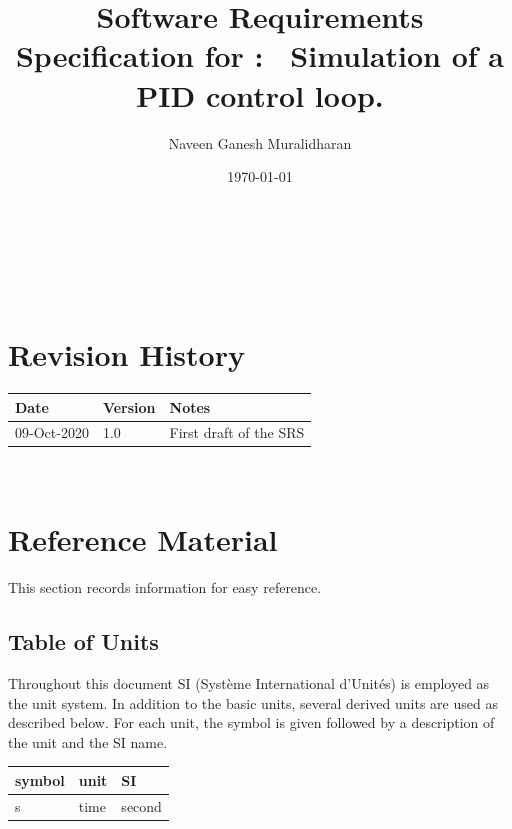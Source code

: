 \documentclass[12pt]{article}
\begin{document}
\title{Software Requirements Specification for \progname: \
Simulation of a PID control loop.} 
\author{Naveen Ganesh Muralidharan}
\date{\today}
	
\maketitle

~\newpage


\tableofcontents

~\newpage

\section*{Revision History}

\begin{tabularx}{\textwidth}{p{3cm}p{2cm}X}
\toprule {\bf Date} & {\bf Version} & {\bf Notes}\\
\midrule
09-Oct-2020 & 1.0 & First draft of the SRS\\
\bottomrule
\end{tabularx}

~\newpage

\section{Reference Material}

This section records information for easy reference.

\subsection{Table of Units}

Throughout this document SI (Syst\`{e}me International d'Unit\'{e}s) is employed
as the unit system.  In addition to the basic units, several derived units are
used as described below.  For each unit, the symbol is given followed by a
description of the unit and the SI name.
~\newline

\renewcommand{\arraystretch}{1.2}
  \noindent \begin{tabular}{l l l} 
    \toprule		
    \textbf{symbol} & \textbf{unit} & \textbf{SI}\\
    \midrule 
    \si{\second} & time & second\\
    \bottomrule
  \end{tabular}
\end{document}
